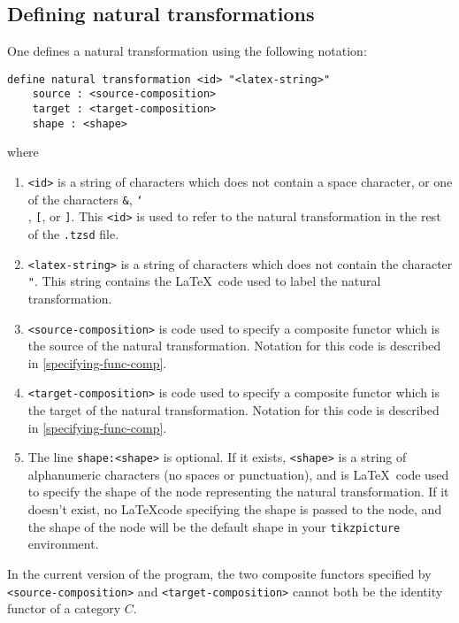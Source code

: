 \documentclass{amsart}
\newcommand{\vlength}{0.2cm}
\begin{document}
\subsection{Defining natural transformations}
One defines a natural transformation using the following notation:
\vspace{\vlength}
\begin{verbatim}
define natural transformation <id> "<latex-string>"
    source : <source-composition>
    target : <target-composition>
    shape : <shape>
\end{verbatim}
\vspace\vlength
where
\begin{enumerate}
    \item \texttt{<id>} is a string of characters which does not contain a space character,
        or one of the characters \texttt{\&}, \texttt{\char`\\}, \texttt{[}, or \texttt{]}.
        This \texttt{<id>} is used to refer to the natural transformation in the rest of the
        \texttt{.tzsd} file.
    \item \texttt{<latex-string>} is a string of characters which does not contain the character
        \texttt{"}.
        This string contains the \LaTeX\ code used to label the natural transformation.
    \item \texttt{<source-composition>} is code used to specify a composite functor which is
        the source of the natural transformation.
        Notation for this code is described in \ref{specifying-func-comp}.
    \item \texttt{<target-composition>} is code used to specify a composite functor which is
        the target of the natural transformation.
        Notation for this code is described in \ref{specifying-func-comp}.
    \item The line \texttt{shape:<shape>} is optional.
        If it exists, \texttt{<shape>} is a string of alphanumeric characters
            (no spaces or punctuation),
            and is \LaTeX\ code used to specify the shape of the 
            node representing the natural
            transformation.
        If it doesn't exist, no \LaTeX code specifying the shape is passed to the
            node, and the shape of the node will be the default shape
            in your \texttt{tikzpicture} environment.
\end{enumerate}
In the current version of the program, the two composite functors specified by \texttt{<source-composition>}
    and \texttt{<target-composition>} cannot both be the identity functor of a category $C$.
\end{document}
